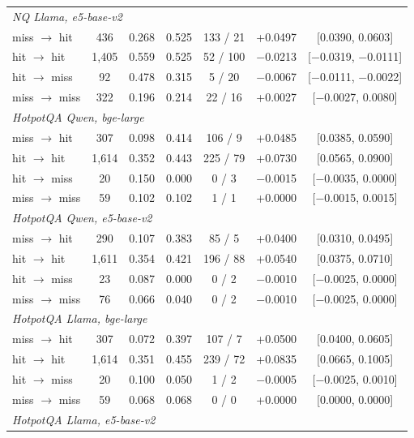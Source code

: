 \begin{table}[t]
\begin{tabular}{lcccccc}
\multicolumn{7}{l}{\emph{NQ Llama, e5-base-v2}} \\
\quad miss $\to$ hit & 436 & 0.268 & 0.525 & 133 / 21 & +0.0497 & [0.0390, 0.0603] \\
\quad hit $\to$ hit & 1,405 & 0.559 & 0.525 & 52 / 100 & \ensuremath{-}0.0213 & [\ensuremath{-}0.0319, \ensuremath{-}0.0111] \\
\quad hit $\to$ miss & 92 & 0.478 & 0.315 & 5 / 20 & \ensuremath{-}0.0067 & [\ensuremath{-}0.0111, \ensuremath{-}0.0022] \\
\quad miss $\to$ miss & 322 & 0.196 & 0.214 & 22 / 16 & +0.0027 & [\ensuremath{-}0.0027, 0.0080] \\
\multicolumn{7}{l}{\emph{HotpotQA Qwen, bge-large}} \\
\quad miss $\to$ hit & 307 & 0.098 & 0.414 & 106 / 9 & +0.0485 & [0.0385, 0.0590] \\
\quad hit $\to$ hit & 1,614 & 0.352 & 0.443 & 225 / 79 & +0.0730 & [0.0565, 0.0900] \\
\quad hit $\to$ miss & 20 & 0.150 & 0.000 & 0 / 3 & \ensuremath{-}0.0015 & [\ensuremath{-}0.0035, 0.0000] \\
\quad miss $\to$ miss & 59 & 0.102 & 0.102 & 1 / 1 & +0.0000 & [\ensuremath{-}0.0015, 0.0015] \\
\multicolumn{7}{l}{\emph{HotpotQA Qwen, e5-base-v2}} \\
\quad miss $\to$ hit & 290 & 0.107 & 0.383 & 85 / 5 & +0.0400 & [0.0310, 0.0495] \\
\quad hit $\to$ hit & 1,611 & 0.354 & 0.421 & 196 / 88 & +0.0540 & [0.0375, 0.0710] \\
\quad hit $\to$ miss & 23 & 0.087 & 0.000 & 0 / 2 & \ensuremath{-}0.0010 & [\ensuremath{-}0.0025, 0.0000] \\
\quad miss $\to$ miss & 76 & 0.066 & 0.040 & 0 / 2 & \ensuremath{-}0.0010 & [\ensuremath{-}0.0025, 0.0000] \\
\multicolumn{7}{l}{\emph{HotpotQA Llama, bge-large}} \\
\quad miss $\to$ hit & 307 & 0.072 & 0.397 & 107 / 7 & +0.0500 & [0.0400, 0.0605] \\
\quad hit $\to$ hit & 1,614 & 0.351 & 0.455 & 239 / 72 & +0.0835 & [0.0665, 0.1005] \\
\quad hit $\to$ miss & 20 & 0.100 & 0.050 & 1 / 2 & \ensuremath{-}0.0005 & [\ensuremath{-}0.0025, 0.0010] \\
\quad miss $\to$ miss & 59 & 0.068 & 0.068 & 0 / 0 & +0.0000 & [0.0000, 0.0000] \\
\multicolumn{7}{l}{\emph{HotpotQA Llama, e5-base-v2}} \\

\end{tabular}
\end{table}

